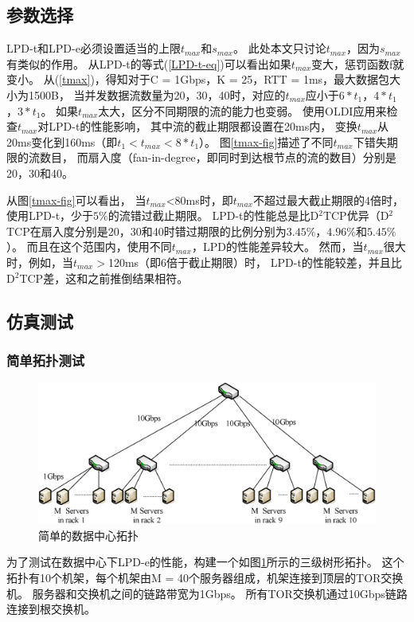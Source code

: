 \subsection{参数选择}
LPD-t和LPD-e必须设置适当的上限$t_{max}$和$s_{max}$。
此处本文只讨论$t_{max}$，因为$s_{max}$有类似的作用。
从LPD-t的等式(\ref{LPD-t-eq})可以看出如果$t_{max}$变大，惩罚函数f就变小。
从(\ref{tmax})，得知对于C = 1Gbps，K = 25，RTT = 1ms，最大数据包大小为1500B，
当并发数据流数量为20，30，40时，对应的$t_{max}$应小于$6 * t_1$，$4 * t_1$，$3 * t_1$。
如果$t_{max}$太大，区分不同期限的流的能力也变弱。
使用OLDI应用来检查$t_{max}$对LPD-t的性能影响，
其中流的截止期限都设置在20ms内，
变换$t_{max}$从20ms变化到160ms（即$t_1 <t_{max} <8 * t_1$）。
图\ref{tmax-fig}描述了不同$t_{max}$下错失期限的流数目，
而扇入度（fan-in-degree，即同时到达根节点的流的数目）分别是20，30和40。


从图\ref{tmax-fig}可以看出，
当$t_{max} $<80ms时，即$t_{max}$不超过最大截止期限的4倍时，使用LPD-t，少于$5\%$的流错过截止期限。
LPD-t的性能总是比D$^2$TCP优异（D$^2$TCP在扇入度分别是20，30和40时错过期限的比例分别为$3.45\%$，$4.96\%$和$5.45\%$）。
而且在这个范围内，使用不同$t_{max}$，LPD的性能差异较大。
然而，当$t_{max}$很大时，例如，当$t_{max}>$120ms（即6倍于截止期限）时，
LPD-t的性能较差，并且比D$^2$TCP差，这和之前推倒结果相符。


\subsection{仿真测试}

\subsubsection{简单拓扑测试}
\begin{figure}[H] 
  \centering
  \includegraphics[width=0.9\columnwidth]{figures/LPD/DataCenter.eps}
  \caption{简单的数据中心拓扑}
\label{DataCenterTop-fig}
\end{figure}

为了测试在数据中心下LPD-e的性能，构建一个如图\ref{DataCenterTop-fig}所示的三级树形拓扑。
这个拓扑有10个机架，每个机架由M = 40个服务器组成，机架连接到顶层的TOR交换机。
服务器和交换机之间的链路带宽为1Gbps。
所有TOR交换机通过10Gbps链路连接到根交换机。

